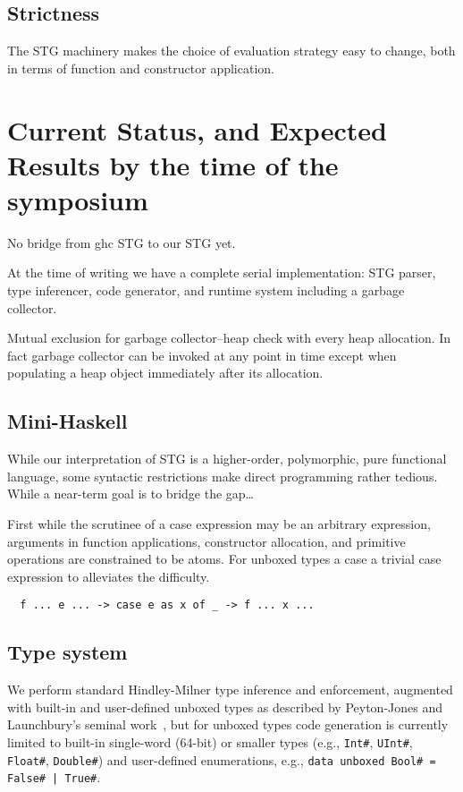 \documentclass{llncs}
\begin{document}
\subsection{Strictness}

The STG machinery makes the choice of evaluation strategy easy to change, both
in terms of function and constructor application.


\section{Current Status, and Expected Results by the time of the symposium}

No bridge from ghc STG to our STG yet.

At the time of writing we have a complete serial implementation: STG parser,
type inferencer, code generator, and runtime system including a garbage
collector.

Mutual exclusion for garbage collector--heap check with every heap allocation.
In fact garbage collector can be invoked at any point in time except when
populating a heap object immediately after its allocation.

\subsection{Mini-Haskell}

While our interpretation of STG is a higher-order, polymorphic, pure
functional language, some syntactic restrictions make direct programming
rather tedious.  While a near-term goal is to bridge the gap\ldots

First while the scrutinee of a case expression may be an arbitrary expression,
arguments in function applications, constructor allocation, and primitive
operations are constrained to be atoms.  For unboxed types a case
a trivial case expression to alleviates
the difficulty.
\begin{verbatim}
  f ... e ... -> case e as x of _ -> f ... x ...
\end{verbatim}



\subsection{Type system}

We perform standard Hindley-Milner type inference and enforcement, augmented
with built-in and user-defined unboxed types as described by Peyton-Jones and
Launchbury's seminal work~\cite{unboxed}, but for unboxed types code
generation is currently limited to built-in single-word (64-bit) or smaller
types (e.g., \texttt{Int\#}, \texttt{UInt\#}, \texttt{Float\#}, \texttt{Double\#})
and user-defined enumerations, e.g., \texttt{data unboxed Bool\# = False\# |
  True\#}.
\end{document}
